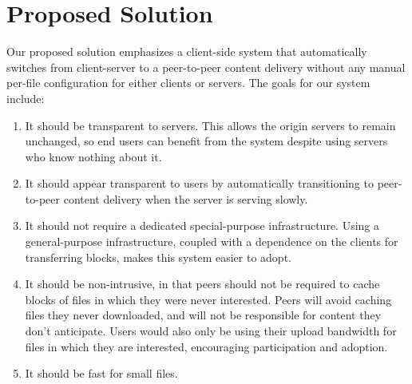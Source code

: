 \section {Proposed Solution}\label{section:solution}
Our proposed solution emphasizes a client-side system that automatically switches from client-server to a peer-to-peer content delivery without any manual per-file 
configuration for either clients or servers.  The goals for our system include:
\begin{enumerate}
\item It should be transparent to servers.  This allows the origin servers to remain unchanged, 
so end users can benefit from the system despite using servers who know nothing about it.
\item It should appear transparent to users by automatically transitioning to peer-to-peer content delivery when the server is serving slowly.
\item It should not require a dedicated special-purpose infrastructure.  Using a general-purpose infrastructure, coupled with a dependence on the clients 
for transferring blocks, makes this system easier to adopt.
\item It should be non-intrusive, in that peers should not be 
required to cache blocks of files in which they were never interested.  Peers will avoid caching files they never downloaded, and will not be responsible for 
content they don't anticipate.  Users would also only be using their upload bandwidth for files in which they are interested, encouraging participation and adoption.
\item It should be fast for small files.
\end{enumerate}
